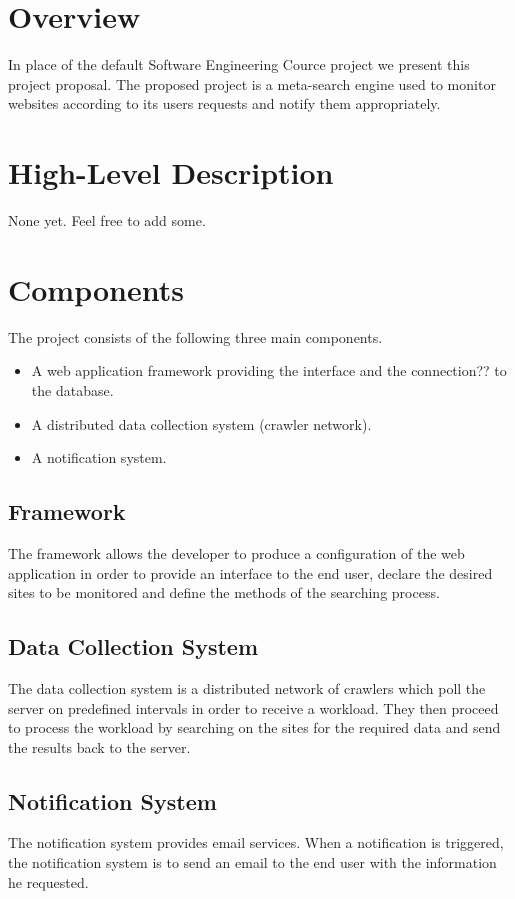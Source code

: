 \documentclass[a4paper,10pt]{article} \usepackage{anysize}
\begin{document}



\section{Overview}
    In place of the default Software Engineering Cource project we present this
    project proposal. The proposed project is a meta-search engine used to monitor
    websites according to its users requests and notify them appropriately. 

\section{High-Level Description}
    None yet. Feel free to add some.
\section{Components}
    The project consists of the following three main components.
    \begin{itemize}
        \item A web application framework providing the interface and the
            connection?? to the database.
        \item A distributed data collection system (crawler network).
        \item A notification system.
    \end{itemize}
    \subsection{Framework}
        The framework allows the developer to produce a configuration of the web
        application in order to provide an interface to the end user, declare the
        desired sites to be monitored and define the methods of the searching process.
    \subsection{Data Collection System}
        The data collection system is a distributed network of crawlers which poll
        the server on predefined intervals in order to receive a workload. They then
        proceed to process the workload by searching on the sites for the required data 
        and send the results back to the server.
    \subsection{Notification System}
        The notification system provides email services. When a notification is
        triggered, the notification system is to send an email to the end user
        with the information he requested.
\end{document}
